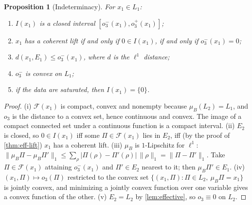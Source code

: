 \documentclass[11pt]{article}
\newtheorem{proposition}[theorem]{Proposition}
\theoremstyle{definition}
\theoremstyle{remark}
\begin{document}
\begin{proposition}[Indeterminacy]\label{prop:indeterminacy}
For $x_1\in L_1$:
\begin{enumerate}[label=(\roman*)]
\item $I(x_1)$ is a closed interval $[o_3^-(x_1),o_3^+(x_1)]$;
\item $x_1$ has a coherent lift if and only if $0\in I(x_1)$, if and only if $o_3^-(x_1)=0$;
\item $d(x_1,E_1)\le o_3^-(x_1)$, where $d$ is the $\ell^1$ distance;
\item $o_3^-$ is convex on $L_1$;
\item if the data are saturated, then $I(x_1)=\{0\}$.
\end{enumerate}
\end{proposition}
\begin{proof}
(i) $\mathcal{F}(x_1)$ is compact, convex and nonempty because $\mu_B(L_2)=L_1$, and $o_3$ is the
distance to a convex set, hence continuous and convex. The image of a compact connected set under a
continuous function is a compact interval.
(ii) $E_2$ is closed, so $0\in I(x_1)$ iff some $\Pi\in\mathcal{F}(x_1)$ lies in $E_2$, iff (by the
proof of \cref{thm:eff-lift}) $x_1$ has a coherent lift.
(iii) $\mu_B$ is $1$-Lipschitz for $\ell^1$: $\lVert\mu_B\Pi-\mu_B\Pi'\rVert_1\le\sum_\rho
\lvert\Pi(\rho)-\Pi'(\rho)\rvert\,\lVert\rho\rVert_1=\lVert\Pi-\Pi'\rVert_1$. Take $\Pi\in\mathcal{F}(x_1)$
attaining $o_3^-(x_1)$ and $\Pi'\in E_2$ nearest to it; then $\mu_B\Pi'\in E_1$.
(iv) $(x_1,\Pi)\mapsto o_3(\Pi)$ restricted to the convex set $\{(x_1,\Pi):\Pi\in L_2,\ \mu_B\Pi=x_1\}$ is
jointly convex, and minimizing a jointly convex function over one variable gives a convex function of
the other.
(v) $E_2=L_2$ by \cref{lem:effective}, so $o_3\equiv0$ on $L_2$.
\end{proof}
\end{document}

